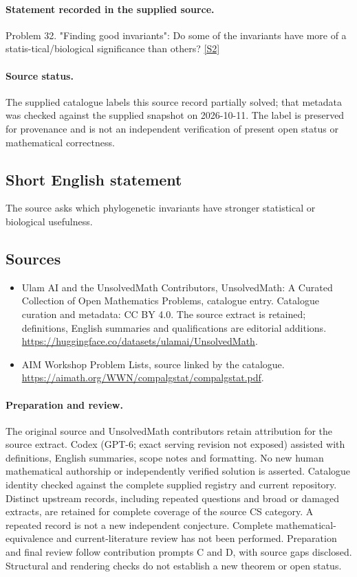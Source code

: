 \documentclass[11pt]{article}
\begin{document}
\paragraph{Statement recorded in the supplied source.}
Problem 32. "Finding good invariants": Do some of the invariants have more of a statis-tical/biological significance than others? \href{https://aimath.org/WWN/compalgstat/compalgstat.pdf}{[S2]}
\paragraph{Source status.}
The supplied catalogue labels this source record partially solved; that metadata was checked against the supplied snapshot on 2026-10-11. The label is preserved for provenance and is not an independent verification of present open status or mathematical correctness.
\subsection{Short English statement}
The source asks which phylogenetic invariants have stronger statistical or biological usefulness.
\subsection{Sources}
\begin{itemize}
\item[S1] Ulam AI and the UnsolvedMath Contributors, UnsolvedMath: A Curated Collection of Open Mathematics Problems, catalogue entry. Catalogue curation and metadata: CC BY 4.0. The source extract is retained; definitions, English summaries and qualifications are editorial additions.
\url{https://huggingface.co/datasets/ulamai/UnsolvedMath}.
\item[S2] AIM Workshop Problem Lists, source linked by the catalogue.
\url{https://aimath.org/WWN/compalgstat/compalgstat.pdf}.
\end{itemize}
\paragraph{Preparation and review.}
The original source and UnsolvedMath contributors retain attribution for the source extract. Codex (GPT-6; exact serving revision not exposed) assisted with definitions, English summaries, scope notes and formatting. No new human mathematical authorship or independently verified solution is asserted. Catalogue identity checked against the complete supplied registry and current repository. Distinct upstream records, including repeated questions and broad or damaged extracts, are retained for complete coverage of the source CS category. A repeated record is not a new independent conjecture. Complete mathematical-equivalence and current-literature review has not been performed. Preparation and final review follow contribution prompts C and D, with source gaps disclosed. Structural and rendering checks do not establish a new theorem or open status.
\label{end:statement}
\end{document}
